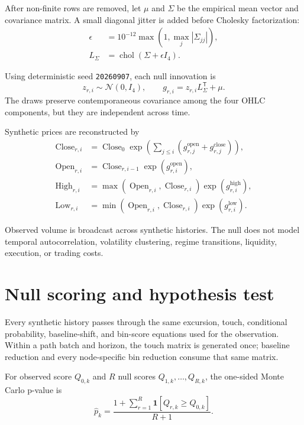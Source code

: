 \documentclass[11pt]{article}
\newcommand{\ind}{\mathbf{1}}
\DeclareMathOperator{\Close}{Close}
\DeclareMathOperator{\Open}{Open}
\DeclareMathOperator{\High}{High}
\DeclareMathOperator{\Low}{Low}
\DeclareMathOperator{\chol}{chol}
\begin{document}
After non-finite rows are removed, let $\mu$ and $\Sigma$ be the empirical
mean vector and covariance matrix. A small diagonal jitter is added before
Cholesky factorization:
\begin{align}
\epsilon
  &=10^{-12}\max\!\left(1,\max_j|\Sigma_{jj}|\right),\\
L_{\Sigma}&=\chol(\Sigma+\epsilon I_4).
\end{align}

Using deterministic seed \texttt{20260907}, each null innovation is
\begin{equation}
z_{r,i}\sim\mathcal N(0,I_4),
\qquad
g_{r,i}=z_{r,i}L_{\Sigma}^\mathsf{T}+\mu.
\end{equation}
The draws preserve contemporaneous covariance among the four OHLC components,
but they are independent across time.

Synthetic prices are reconstructed by
\begin{align}
\Close_{r,i}
  &=\Close_0\exp\!\left(
      \sum_{j\leq i}(g^{\mathrm{open}}_{r,j}+g^{\mathrm{close}}_{r,j})
    \right),\\
\Open_{r,i}
  &=\Close_{r,i-1}\exp(g^{\mathrm{open}}_{r,i}),\\
\High_{r,i}
  &=\max(\Open_{r,i},\Close_{r,i})\exp(g^{\mathrm{high}}_{r,i}),\\
\Low_{r,i}
  &=\min(\Open_{r,i},\Close_{r,i})\exp(g^{\mathrm{low}}_{r,i}).
\end{align}

Observed volume is broadcast across synthetic histories. The null does not
model temporal autocorrelation, volatility clustering, regime transitions,
liquidity, execution, or trading costs.

\section{Null scoring and hypothesis test}

Every synthetic history passes through the same excursion, touch, conditional
probability, baseline-shift, and bin-score equations used for the observation.
Within a path batch and horizon, the touch matrix is generated once; baseline
reduction and every node-specific bin reduction consume that same matrix.

For observed score $Q_{0,k}$ and $R$ null scores
$Q_{1,k},\ldots,Q_{R,k}$, the one-sided
Monte Carlo p-value is
\begin{equation}
\widehat p_k
=\frac{
  1+\sum_{r=1}^{R}
  \ind\!\left[Q_{r,k}\geq Q_{0,k}\right]
}{R+1}.
\end{equation}
\end{document}
